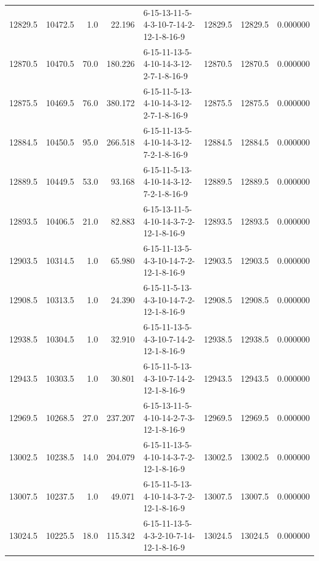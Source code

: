 \begin{tabular}{rrrrlrrr}
 12829.5 &  10472.5 &            1.0 &             22.196 &  6-15-13-11-5-4-3-10-7-14-2-12-1-8-16-9 &       12829.5 &         12829.5 &  0.000000 \\
 12870.5 &  10470.5 &           70.0 &            180.226 &  6-15-11-13-5-4-10-14-3-12-2-7-1-8-16-9 &       12870.5 &         12870.5 &  0.000000 \\
 12875.5 &  10469.5 &           76.0 &            380.172 &  6-15-11-5-13-4-10-14-3-12-2-7-1-8-16-9 &       12875.5 &         12875.5 &  0.000000 \\
 12884.5 &  10450.5 &           95.0 &            266.518 &  6-15-11-13-5-4-10-14-3-12-7-2-1-8-16-9 &       12884.5 &         12884.5 &  0.000000 \\
 12889.5 &  10449.5 &           53.0 &             93.168 &  6-15-11-5-13-4-10-14-3-12-7-2-1-8-16-9 &       12889.5 &         12889.5 &  0.000000 \\
 12893.5 &  10406.5 &           21.0 &             82.883 &  6-15-13-11-5-4-10-14-3-7-2-12-1-8-16-9 &       12893.5 &         12893.5 &  0.000000 \\
 12903.5 &  10314.5 &            1.0 &             65.980 &  6-15-11-13-5-4-3-10-14-7-2-12-1-8-16-9 &       12903.5 &         12903.5 &  0.000000 \\
 12908.5 &  10313.5 &            1.0 &             24.390 &  6-15-11-5-13-4-3-10-14-7-2-12-1-8-16-9 &       12908.5 &         12908.5 &  0.000000 \\
 12938.5 &  10304.5 &            1.0 &             32.910 &  6-15-11-13-5-4-3-10-7-14-2-12-1-8-16-9 &       12938.5 &         12938.5 &  0.000000 \\
 12943.5 &  10303.5 &            1.0 &             30.801 &  6-15-11-5-13-4-3-10-7-14-2-12-1-8-16-9 &       12943.5 &         12943.5 &  0.000000 \\
 12969.5 &  10268.5 &           27.0 &            237.207 &  6-15-13-11-5-4-10-14-2-7-3-12-1-8-16-9 &       12969.5 &         12969.5 &  0.000000 \\
 13002.5 &  10238.5 &           14.0 &            204.079 &  6-15-11-13-5-4-10-14-3-7-2-12-1-8-16-9 &       13002.5 &         13002.5 &  0.000000 \\
 13007.5 &  10237.5 &            1.0 &             49.071 &  6-15-11-5-13-4-10-14-3-7-2-12-1-8-16-9 &       13007.5 &         13007.5 &  0.000000 \\
 13024.5 &  10225.5 &           18.0 &            115.342 &  6-15-11-13-5-4-3-2-10-7-14-12-1-8-16-9 &       13024.5 &         13024.5 &  0.000000 \\

\end{tabular}
